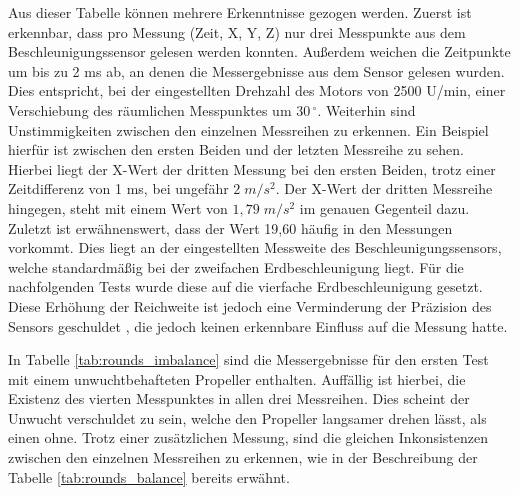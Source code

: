 Aus dieser Tabelle können mehrere Erkenntnisse gezogen werden.
Zuerst ist erkennbar, dass pro Messung (Zeit, X, Y, Z) nur drei Messpunkte aus dem Beschleunigungssensor gelesen werden konnten.
Außerdem weichen die Zeitpunkte um bis zu 2 \ac{ms} ab, an denen die Messergebnisse aus dem Sensor gelesen wurden.
Dies entspricht, bei der eingestellten Drehzahl des Motors von 2500 U/min, einer Verschiebung des räumlichen Messpunktes um 30$\,^\circ$.
Weiterhin sind Unstimmigkeiten zwischen den einzelnen Messreihen zu erkennen.
Ein Beispiel hierfür ist zwischen den ersten Beiden und der letzten Messreihe zu sehen.
Hierbei liegt der X-Wert der dritten Messung bei den ersten Beiden, trotz einer Zeitdifferenz von 1 \ac{ms}, bei ungefähr $2\;m/s^2$.
Der X-Wert der dritten Messreihe hingegen, steht mit einem Wert von $1,79\;m/s^2$ im genauen Gegenteil dazu.
Zuletzt ist erwähnenswert, dass der Wert 19,60 häufig in den Messungen vorkommt.
Dies liegt an der eingestellten Messweite des Beschleunigungssensors, welche standardmäßig bei der zweifachen Erdbeschleunigung liegt.
Für die nachfolgenden Tests wurde diese auf die vierfache Erdbeschleunigung gesetzt.
Diese Erhöhung der Reichweite ist jedoch eine Verminderung der Präzision des Sensors geschuldet \cite{lsm9ds1_manual}, die jedoch keinen erkennbare Einfluss auf die Messung hatte.

In Tabelle \ref{tab:rounds_imbalance} sind die Messergebnisse für den ersten Test mit einem unwuchtbehafteten Propeller enthalten.
Auffällig ist hierbei, die Existenz des vierten Messpunktes in allen drei Messreihen.
Dies scheint der Unwucht verschuldet zu sein, welche den Propeller langsamer drehen lässt, als einen ohne.
Trotz einer zusätzlichen Messung, sind die gleichen Inkonsistenzen zwischen den einzelnen Messreihen zu erkennen, wie in der Beschreibung der Tabelle \ref{tab:rounds_balance} bereits erwähnt.

\begin{table}[H]
\centering
{}
\caption{Messergebnisse von Propellerumdrehungen mit Unwucht}
\label{tab:rounds_imbalance}
\end{table}


